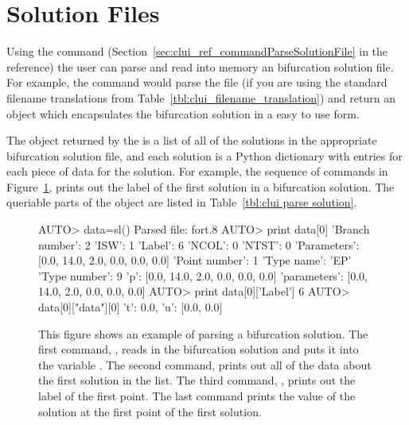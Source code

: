 \section{Solution Files}
Using the  
command (Section~\ref{sec:clui_ref_commandParseSolutionFile} in the reference)
the user can parse and read into memory an \AUTOc bifurcation
solution file.   For example, the command  
would parse the file  (if you are using the standard
filename translations from Table~\ref{tbl:clui_filename_translation})
and return an object which encapsulates
the bifurcation solution in a easy to use form.

The object returned by the  
is a list of all of the solutions in the appropriate
bifurcation solution file, and each solution is a Python
dictionary with entries for each  piece of
data for the solution.  For example, the sequence of commands
in Figure~\ref{exa:clui parse solution}, prints out the
label of the first solution in a bifurcation solution.
The queriable parts of the object are listed in
Table~\ref{tbl:clui parse solution}.

\begin{figure}[htbp]
{\small \begin{center} \begin{boxedverbatim}
AUTO> data=sl()
Parsed file: fort.8
AUTO> print data[0]
'Branch number': 2
'ISW': 1
'Label': 6
'NCOL': 0
'NTST': 0
'Parameters': [0.0, 14.0, 2.0, 0.0, 0.0, 0.0]
'Point number': 1
'Type name': 'EP'
'Type number': 9
'p': [0.0, 14.0, 2.0, 0.0, 0.0, 0.0]
'parameters': [0.0, 14.0, 2.0, 0.0, 0.0, 0.0]
AUTO> print data[0]['Label']
6
AUTO> data[0]["data"][0]
{'t': 0.0, 'u': [0.0, 0.0]}
\end{boxedverbatim}
\end{center} 
}
\caption[An example of parsing a bifurcation solution.]
{This figure shows an example of parsing a bifurcation solution.
The first command, , reads in the bifurcation
solution and puts it into the variable .
The second command,  prints out all of
the data about the first solution in the list.
The third command, , prints
out the label of the first point.  The last command prints
the value of the solution at the first point of the
first solution.
}
\label{exa:clui parse solution}
\end{figure}

